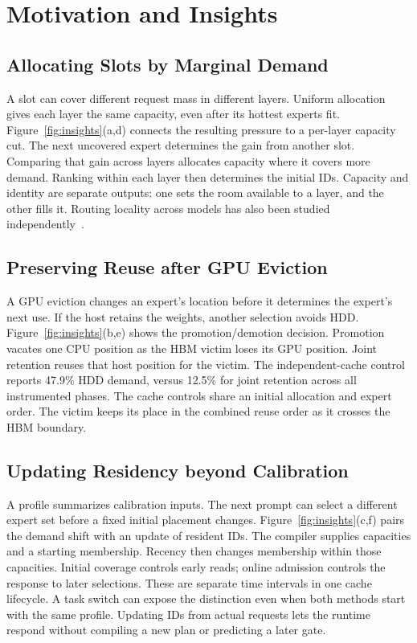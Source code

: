\documentclass[conference,9pt,letterpaper]{IEEEtran}
\begin{document}
\section{Motivation and Insights}
\label{sec:challenges}
\subsection{Allocating Slots by Marginal Demand}
A slot can cover different request mass in different layers. Uniform allocation gives each layer the same capacity, even after its hottest experts fit. Figure~\ref{fig:insights}(a,d) connects the resulting pressure to a per-layer capacity cut. The next uncovered expert determines the gain from another slot. Comparing that gain across layers allocates capacity where it covers more demand. Ranking within each layer then determines the initial IDs. Capacity and identity are separate outputs: one sets the room available to a layer, and the other fills it. Routing locality across models has also been studied independently~\cite{routingconsistency}.

\subsection{Preserving Reuse after GPU Eviction}
A GPU eviction changes an expert's location before it determines the expert's next use. If the host retains the weights, another selection avoids HDD. Figure~\ref{fig:insights}(b,e) shows the promotion/demotion decision. Promotion vacates one CPU position as the HBM victim loses its GPU position. Joint retention reuses that host position for the victim. The independent-cache control reports 47.9\% HDD demand, versus 12.5\% for joint retention across all instrumented phases. The cache controls share an initial allocation and expert order. The victim keeps its place in the combined reuse order as it crosses the HBM boundary.

\subsection{Updating Residency beyond Calibration}
A profile summarizes calibration inputs. The next prompt can select a different expert set before a fixed initial placement changes. Figure~\ref{fig:insights}(c,f) pairs the demand shift with an update of resident IDs. The compiler supplies capacities and a starting membership. Recency then changes membership within those capacities. Initial coverage controls early reads; online admission controls the response to later selections. These are separate time intervals in one cache lifecycle. A task switch can expose the distinction even when both methods start with the same profile. Updating IDs from actual requests lets the runtime respond without compiling a new plan or predicting a later gate.
\end{document}
